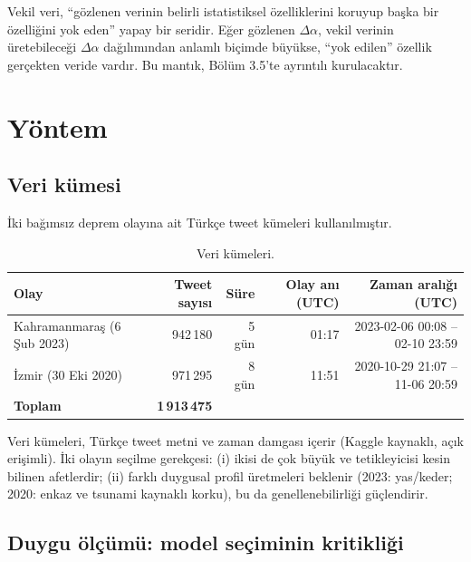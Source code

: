 \documentclass[11pt,a4paper]{article}
\newcommand{\Dal}{\Delta\alpha}
\begin{document}
Vekil veri, ``gözlenen verinin belirli istatistiksel özelliklerini koruyup
başka bir özelliğini yok eden'' yapay bir seridir. Eğer gözlenen $\Dal$,
vekil verinin üretebileceği $\Dal$ dağılımından anlamlı biçimde büyükse,
``yok edilen'' özellik gerçekten veride vardır. Bu mantık, Bölüm 3.5'te
ayrıntılı kurulacaktır.

\section{Yöntem}

\subsection{Veri kümesi}

İki bağımsız deprem olayına ait Türkçe tweet kümeleri kullanılmıştır.

\begin{table}[H]
\centering
\caption{Veri kümeleri.}
\label{tab:data}
\begin{tabular}{lrrrr}
\toprule
Olay & Tweet sayısı & Süre & Olay anı (UTC) & Zaman aralığı (UTC)\\
\midrule
Kahramanmaraş (6 Şub 2023) & 942\,180 & 5 gün & 01:17 & 2023-02-06 00:08 -- 02-10 23:59\\
İzmir (30 Eki 2020)        & 971\,295 & 8 gün & 11:51 & 2020-10-29 21:07 -- 11-06 20:59\\
\midrule
\textbf{Toplam} & \textbf{1\,913\,475} & & & \\
\bottomrule
\end{tabular}
\end{table}

Veri kümeleri, Türkçe tweet metni ve zaman damgası içerir (Kaggle kaynaklı,
açık erişimli). İki olayın seçilme gerekçesi: (i) ikisi de çok büyük ve
tetikleyicisi kesin bilinen afetlerdir; (ii) farklı duygusal profil
üretmeleri beklenir (2023: yas/keder; 2020: enkaz ve tsunami kaynaklı korku),
bu da genellenebilirliği güçlendirir.

\subsection{Duygu ölçümü: model seçiminin kritikliği}
\end{document}
